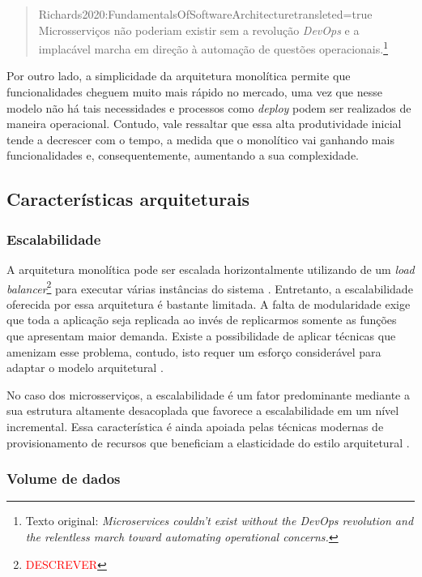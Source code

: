 \begin{quotation}{Richards2020:FundamentalsOfSoftwareArchitecture}{transleted=true}
    Microsserviços não poderiam existir sem a revolução \textit{DevOps} e a implacável marcha em direção à
    automação de questões operacionais.\footnote{Texto original: \textit{Microservices couldn't exist
    without the DevOps revolution and the relentless march toward automating operational concerns.}}
\end{quotation}

Por outro lado, a simplicidade da arquitetura monolítica permite que funcionalidades cheguem muito
mais rápido no mercado, uma vez que nesse modelo não há tais necessidades e processos como
\textit{deploy} podem ser realizados de maneira operacional. Contudo, vale ressaltar que essa alta
produtividade inicial tende a decrescer com o tempo, a medida que o monolítico vai ganhando mais
funcionalidades e, consequentemente, aumentando a sua complexidade.

\subsection{Características arquiteturais}

\subsubsection{Escalabilidade}

A arquitetura monolítica pode ser escalada horizontalmente utilizando de um \textit{load
balancer}\footnote{\textcolor{red}{DESCREVER}} para executar várias instâncias do sistema
\cite{MartinFowler:Microservices}. Entretanto, a escalabilidade oferecida por essa arquitetura é
bastante limitada. A falta de modularidade exige que toda a aplicação seja replicada ao invés
de replicarmos somente as funções que apresentam maior demanda. Existe a possibilidade de aplicar técnicas
que amenizam esse problema, contudo, isto requer um esforço considerável para adaptar o modelo
arquitetural \cite{Richards2020:FundamentalsOfSoftwareArchitecture}.

No caso dos microsserviços, a escalabilidade é um fator predominante mediante a sua estrutura
altamente desacoplada que favorece a escalabilidade em um nível incremental. Essa característica é
ainda apoiada pelas técnicas modernas de provisionamento de recursos que beneficiam a elasticidade
do estilo arquitetural \cite{Richards2020:FundamentalsOfSoftwareArchitecture}.

\subsubsection{Volume de dados}

